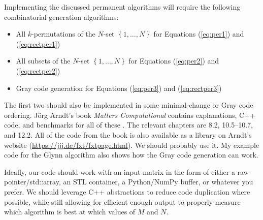 \documentclass{article}
\begin{document}
Implementing the discussed permanent algorithms will require the following combinatorial generation
algorithms:
\begin{itemize}
    \item All $k$-permutations of the $N$-set $\left\{1,\dots,N\right\}$
          for Equations (\ref{eq:per1}) and (\ref{eq:rectper1})
    \item All subsets of the $N$-set $\left\{1,\dots,N\right\}$ for Equations (\ref{eq:per2}) and
          (\ref{eq:rectper2})
    \item Gray code generation for Equations (\ref{eq:per3}) and (\ref{eq:rectper3})
\end{itemize}
The first two should also be implemented in some minimal-change or Gray code ordering.  J\"{o}rg
Arndt's book \emph{Matters Computational} contains explanations, C++ code, and benchmarks for all of
these \cite{arndt2010}. The relevant chapters are 8.2, 10.5--10.7, and 12.2. All of the code from the book
is also available as a library on Arndt's website (\url{https://jjj.de/fxt/fxtpage.html}). We should
probably use it. My example code for the Glynn algorithm also shows how the Gray code generation can work.

Ideally, our code should work with an input matrix in the form of either a raw pointer/std::array,
an STL container, a Python/NumPy buffer, or whatever you prefer. We should leverage C++ abstractions
to reduce code duplication where possible, while still allowing for efficient enough output to
properly measure which algorithm is best at which values of $M$ and $N$.

\pagebreak



\end{document}
